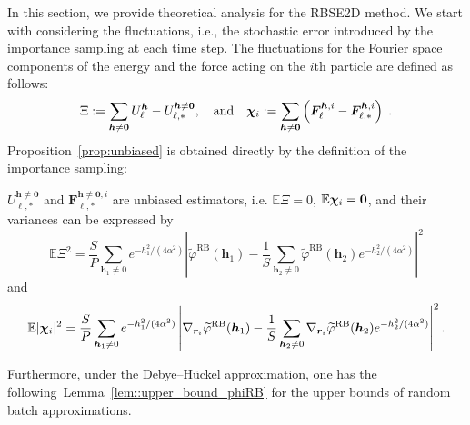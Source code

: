 In this section, we provide theoretical analysis for the RBSE2D method. We start with considering the fluctuations, i.e., the stochastic error introduced by the importance sampling at each time step.
The fluctuations for the Fourier space components of the energy and the force acting on the $i$th particle are defined as follows:
\begin{equation}\label{eq::xichi}
	\Xi := \sum_{\bm{h}\neq\bm{0}}U_{\ell}^{\bm{h}}-U_{\ell,*}^{\bm{h}\neq\bm{0}},\quad\text{and}\quad\boldsymbol{\chi}_{i} :=\sum_{\bm{h}\neq\bm{0}}\left(\bm{F}_{\ell}^{\bm{h},i}-\bm{F}_{\ell,*}^{\bm{h},i}\right)\;.
\end{equation}
Proposition~\ref{prop:unbiased} is obtained directly by the definition of the importance sampling:
\begin{prop}\label{prop:unbiased}
	$U_{\ell,*}^{\bm{h}\neq\bm{0}}$ and $\bm{F}_{\ell,*}^{\bm{h}\neq\bm{0},i}$ are unbiased estimators, i.e. $\mathbb{E}\Xi= 0$, $\mathbb{E} \boldsymbol{\chi}_{i} = \bm 0$, and their variances can be expressed by
	\begin{equation}\label{eq::Exi}
		\mathbb{E}\Xi^2=\frac{S}{P}\sum_{\bm{h}_1\neq 0}e^{-h_1^2/(4\alpha^2)}\left|\widetilde{\varphi}^{\text{RB}}(\bm{h}_1)-\frac{1}{S} \sum_{\bm{h}_2\neq 0}\widetilde{\varphi}^{\text{RB}}(\bm{h}_2)e^{-h_2^2/(4\alpha^2)}\right|^2
	\end{equation}
	and
	\begin{equation}\label{eq::Echi}
		\mathbb{E}|\boldsymbol{\chi}_{i}|^2=\frac{S}{P}\sum_{\bm{h}_1\neq 0}e^{-h_1^2/(4\alpha^2)}\left|\nabla_{\bm{r}_i}\widetilde{\varphi}^{\text{RB}}(\bm{h}_1)-\frac{1}{S} \sum_{\bm{h}_2\neq 0}\nabla_{\bm{r}_i}\widetilde{\varphi}^{\text{RB}}(\bm{h}_2)e^{-h_2^2/(4\alpha^2)}\right|^2.
	\end{equation}
\end{prop}

Furthermore, under the Debye--H\"uckel approximation, one has the following~Lemma~\ref{lem::upper_bound_phiRB} for the upper bounds of random batch approximations.

